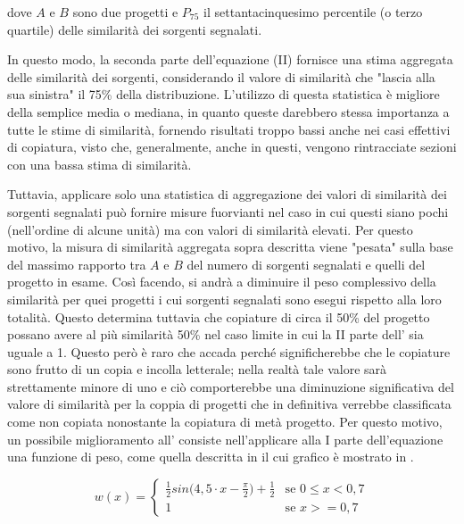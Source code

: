 dove $A$ e $B$ sono due progetti e $P_{75}$ il settantacinquesimo percentile (o terzo quartile) delle similarità dei sorgenti segnalati.

In questo modo, la seconda parte dell'equazione (II) fornisce una stima aggregata delle similarità dei sorgenti, considerando il valore di similarità che "lascia alla sua sinistra" il 75\% della distribuzione.
%
L'utilizzo di questa statistica è migliore della semplice media o mediana, in quanto queste darebbero stessa importanza a tutte le stime di similarità, fornendo risultati troppo bassi anche nei casi effettivi di copiatura, visto che, generalmente, anche in questi, vengono rintracciate sezioni con una bassa stima di similarità.

Tuttavia, applicare solo una statistica di aggregazione dei valori di similarità dei sorgenti segnalati può fornire misure fuorvianti nel caso in cui questi siano pochi (nell'ordine di alcune unità) ma con valori di similarità elevati.
%
Per questo motivo, la misura di similarità aggregata sopra descritta viene "pesata" sulla base del massimo rapporto tra $A$ e $B$ del numero di sorgenti segnalati e quelli del progetto in esame.
%
Così facendo, si andrà a diminuire il peso complessivo della similarità per quei progetti i cui sorgenti segnalati sono esegui rispetto alla loro totalità.
%
Questo determina tuttavia che copiature di circa il 50\% del progetto possano avere al più similarità 50\% nel caso limite in cui la II parte dell' sia uguale a 1.
%
Questo però è raro che accada perché significherebbe che le copiature sono frutto di un copia e incolla letterale; nella realtà tale valore sarà strettamente minore di uno e ciò comporterebbe una diminuzione significativa del valore di similarità per la coppia di progetti che in definitiva verrebbe classificata come non copiata nonostante la copiatura di metà progetto.
%
Per questo motivo, un possibile miglioramento all' consiste nell'applicare alla I parte dell'equazione una funzione di peso, come quella descritta in  il cui grafico è mostrato in .

\begin{equation}
	w(x) = 
		\begin{cases}
			\frac{1}{2} sin\bigl( 4,5 \cdot x - \frac{\pi}{2} \bigr) + \frac{1}{2} & \text{se $0 \leq x < 0,7$} \\
			1 & \text{se $x >= 0,7$}
		\end{cases}	
	\label{eq:weight-function}	
\end{equation}

